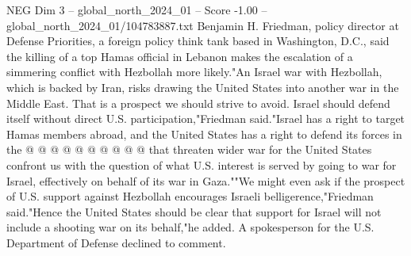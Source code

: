 \begin{textsample}{NEG Dim 3 – global\_north\_2024\_01 – Score -1.00 – global\_north\_2024\_01/104783887.txt}
Benjamin H.
Friedman, policy director at Defense Priorities, a foreign policy think tank based in Washington, D.C., said the killing of a top Hamas official in Lebanon makes the escalation of a simmering conflict with Hezbollah more likely."An Israel war with Hezbollah, which is backed by Iran, risks drawing the United States into another war in the Middle East.
That is a prospect we should strive to avoid.
Israel should defend itself without direct U.S. participation,"Friedman said."Israel has a right to target Hamas members abroad, and the United States has a right to defend its forces in the @ @ @ @ @ @ @ @ @ @ that threaten wider war for the United States confront us with the question of what U.S. interest is served by going to war for Israel, effectively on behalf of its war in Gaza.""We might even ask if the prospect of U.S. support against Hezbollah encourages Israeli belligerence,"Friedman said."Hence the United States should be clear that support for Israel will not include a shooting war on its behalf,"he added.
A spokesperson for the U.S.
Department of Defense declined to comment.

\end{textsample}
